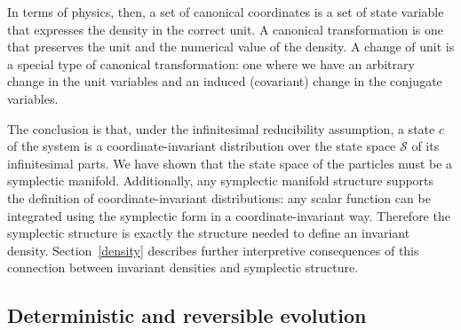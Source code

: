 \documentclass[letterpaper]{article}
\begin{document}
In terms of physics, then, a set of canonical coordinates is a set of state variable that expresses the density in the correct unit. A canonical transformation is one that preserves the unit and the numerical value of the density. A change of unit is a special type of canonical transformation: one where we have an arbitrary change in the unit variables and an induced (covariant) change in the conjugate variables.

The conclusion is that, under the infinitesimal reducibility assumption, a state $c$ of the system is a coordinate-invariant distribution over the state space $\mathcal{S}$ of its infinitesimal parts. We have shown that the state space of the particles must be a symplectic manifold. Additionally, any symplectic manifold structure supports the definition of coordinate-invariant distributions: any scalar function can be integrated using the symplectic form in a coordinate-invariant way. Therefore the symplectic structure is exactly the structure needed to define an invariant density. Section~\ref{density} describes further interpretive consequences of this connection between invariant densities and symplectic structure.

%



\subsection{Deterministic and reversible evolution}
\label{deterministic}
\end{document}
